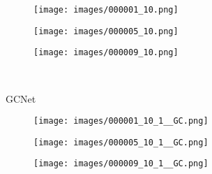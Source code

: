 \begin{figure*}[htpb]
	\captionsetup[subfigure]{labelformat=empty}
	\centering
	\begin{center}
		\begin{minipage}[c]{0.01\textwidth}
			\begin{turn}{90}\footnotesize{}\end{turn}			
		\end{minipage}
		\begin{minipage}[c]{0.985\textwidth}
			\begin{subfigure}[c]{0.33\linewidth}
				\texttt{[image: images/000001\_10.png]}
			\end{subfigure}
			\hspace{-0.5\baselineskip}
			\hfill
			\begin{subfigure}[c]{0.33\linewidth}
				\texttt{[image: images/000005\_10.png]}
			\end{subfigure}
			\hspace{-0.5\baselineskip}
			\hfill
			\begin{subfigure}[c]{0.33\linewidth}
				\texttt{[image: images/000009\_10.png]}
			\end{subfigure}
		\end{minipage}
		\\
\begin{minipage}[c]{0.01\textwidth}
			\begin{turn}{90}\footnotesize{GCNet \cite{kendall2017end}}\end{turn}			
		\end{minipage}
		\begin{minipage}[c]{0.985\textwidth}
			\begin{subfigure}[c]{0.33\linewidth}
				\texttt{[image: images/000001\_10\_1\_\_GC.png]}
			\end{subfigure}
			\hspace{-0.5\baselineskip}
			\hfill
			\begin{subfigure}[c]{0.33\linewidth}
				\texttt{[image: images/000005\_10\_1\_\_GC.png]}
			\end{subfigure}
			\hspace{-0.5\baselineskip}
			\hfill
			\begin{subfigure}[c]{0.33\linewidth}
				\texttt{[image: images/000009\_10\_1\_\_GC.png]}
			\end{subfigure}
			\begin{subfigure}[c]{0.33\linewidth}

\end{subfigure}
\end{minipage}
\end{center}
\end{figure*}
